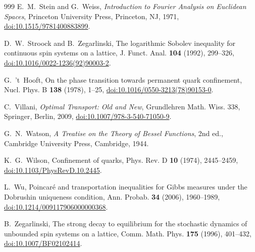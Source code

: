 \documentclass[aps,prd,twocolumn,superscriptaddress,nofootinbib,longbibliography,floatfix,amsmath,amssymb,10pt]{revtex4-2}
\theoremstyle{definition}
\theoremstyle{remark}
\begin{document}
\begin{thebibliography}{999}
E.~M.~Stein and G.~Weiss, \emph{Introduction to Fourier Analysis on Euclidean
Spaces}, Princeton University Press, Princeton, NJ, 1971,
\href{https://doi.org/10.1515/9781400883899}{doi:10.1515/9781400883899}.

D.~W.~Stroock and B.~Zegarlinski, The logarithmic Sobolev inequality for
continuous spin systems on a lattice, J. Funct. Anal. \textbf{104} (1992),
299--326, \href{https://doi.org/10.1016/0022-1236(92)90003-2}{doi:10.1016/0022-1236(92)90003-2}.

G.~'t~Hooft, On the phase transition towards permanent quark confinement,
Nucl. Phys. B \textbf{138} (1978), 1--25,
\href{https://doi.org/10.1016/0550-3213(78)90153-0}{doi:10.1016/0550-3213(78)90153-0}.

C.~Villani, \emph{Optimal Transport: Old and New}, Grundlehren Math. Wiss.
338, Springer, Berlin, 2009,
\href{https://doi.org/10.1007/978-3-540-71050-9}{doi:10.1007/978-3-540-71050-9}.

G.~N.~Watson, \emph{A Treatise on the Theory of Bessel Functions}, 2nd ed.,
Cambridge University Press, Cambridge, 1944.

K.~G.~Wilson, Confinement of quarks, Phys. Rev. D \textbf{10} (1974),
2445--2459, \href{https://doi.org/10.1103/PhysRevD.10.2445}{doi:10.1103/PhysRevD.10.2445}.

L.~Wu, Poincar\'e and transportation inequalities for Gibbs measures under
the Dobrushin uniqueness condition, Ann. Probab. \textbf{34} (2006),
1960--1989, \href{https://doi.org/10.1214/009117906000000368}{doi:10.1214/009117906000000368}.

B.~Zegarlinski, The strong decay to equilibrium for the stochastic dynamics
of unbounded spin systems on a lattice, Comm. Math. Phys. \textbf{175}
(1996), 401--432, \href{https://doi.org/10.1007/BF02102414}{doi:10.1007/BF02102414}.

\end{thebibliography}
\end{document}
